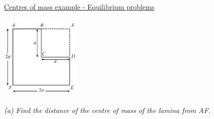\documentclass{article}[18pt]
\begin{document}
\newpage
\begin{center}
\underline{\huge Centres of mass example - Equilibrium problems}
\end{center}
\includegraphics[width=1.5in]{Equilibrium_Problem.JPG}\\
\\
\textit{(a) Find the distance of the centre of mass of the lamina from AF. }\\
\end{document}
